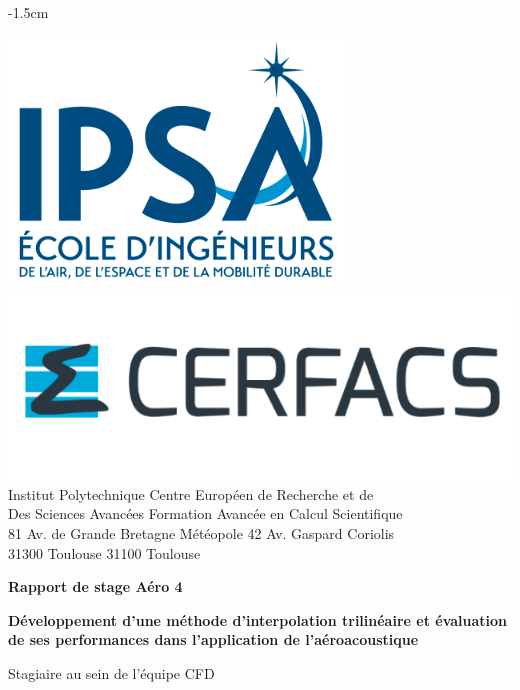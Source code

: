 \begin{titlepage}

    \changepage{3cm}%
           {}%
           {}%
           {}%
           {}%
           {-1.5cm}%
           {}%
           {}%
           {}%

    
    \parindent=0pt
    \includegraphics[scale=0.30]{images/ipsagarde.png}     \includegraphics[scale=0.4]{images/cerfacsgarde.png}\\
    Institut Polytechnique  Centre Européen de Recherche et de \\
    Des Sciences Avancées Formation Avancée en Calcul Scientifique\\
    81 Av. de Grande Bretagne Météopole 42 Av. Gaspard Coriolis\\
    31300 Toulouse 31100 Toulouse
    \vspace*{1.5cm}
    \begin{center}
        \bfseries\LARGE Rapport de stage Aéro 4
    \end{center}
    \hrulefill
    \begin{center}\bfseries\huge
        Développement d'une méthode d'interpolation trilinéaire et évaluation de ses performances dans l'application de l'aéroacoustique
    \end{center}
    \begin{center}\huge
        Stagiaire au sein de l'équipe CFD
    \end{center}



\end{titlepage}
